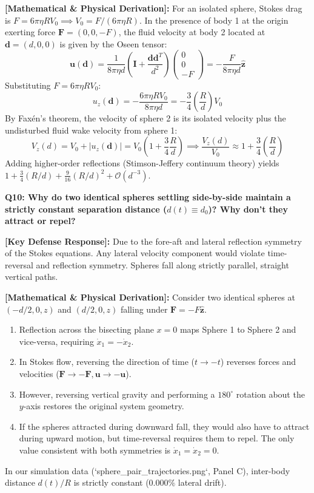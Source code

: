 \documentclass[11pt,a4paper]{article}
\newcommand{\question}[2]{
    \vspace{0.4cm}
    \noindent\colorbox{blue!10}{\parbox{\dimexpr\textwidth-2\fboxsep\relax}{
        \textbf{#1: #2}
    }}
    \vspace{0.2cm}
}
\newcommand{\shortanswer}[1]{
    \noindent\textbf{\textcolor{green!50!black}{[Key Defense Response]:}} #1
    \vspace{0.2cm}
}
\newcommand{\deepdetails}[1]{
    \noindent\textbf{\textcolor{blue!60!black}{[Mathematical \& Physical Derivation]:}} #1
    \vspace{0.2cm}
}
\begin{document}
\deepdetails{
For an isolated sphere, Stokes drag is $F = 6\pi\eta R V_0 \implies V_0 = F / (6\pi\eta R)$. 
In the presence of body 1 at the origin exerting force $\mathbf{F} = (0, 0, -F)$, the fluid velocity at body 2 located at $\mathbf{d} = (d, 0, 0)$ is given by the Oseen tensor:
\begin{equation}
    \mathbf{u}(\mathbf{d}) = \frac{1}{8\pi\eta d} \left( \mathbf{I} + \frac{\mathbf{d}\mathbf{d}^T}{d^2} \right) \begin{pmatrix} 0 \\ 0 \\ -F \end{pmatrix} = -\frac{F}{8\pi\eta d} \hat{\mathbf{z}}
\end{equation}
Substituting $F = 6\pi\eta R V_0$:
\begin{equation}
    u_z(\mathbf{d}) = -\frac{6\pi\eta R V_0}{8\pi\eta d} = -\frac{3}{4} \left(\frac{R}{d}\right) V_0
\end{equation}
By Fax\'en's theorem, the velocity of sphere 2 is its isolated velocity plus the undisturbed fluid wake velocity from sphere 1:
\begin{equation}
    V_z(d) = V_0 + |u_z(\mathbf{d})| = V_0 \left( 1 + \frac{3}{4}\frac{R}{d} \right) \implies \frac{V_z(d)}{V_0} \approx 1 + \frac{3}{4}\left(\frac{R}{d}\right)
\end{equation}
Adding higher-order reflections (Stimson-Jeffery continuum theory) yields $1 + \frac{3}{4}(R/d) + \frac{9}{16}(R/d)^2 + \mathcal{O}(d^{-3})$.
}

\vspace{0.4cm}
\question{Q10}{Why do two identical spheres settling side-by-side maintain a strictly constant separation distance ($d(t) \equiv d_0$)? Why don't they attract or repel?}

\shortanswer{Due to the fore-aft and lateral reflection symmetry of the Stokes equations. Any lateral velocity component would violate time-reversal and reflection symmetry. Spheres fall along strictly parallel, straight vertical paths.}

\deepdetails{
Consider two identical spheres at $(-d/2, 0, z)$ and $(d/2, 0, z)$ falling under $\mathbf{F} = -F \hat{\mathbf{z}}$.
\begin{enumerate}
    \item Reflection across the bisecting plane $x = 0$ maps Sphere 1 to Sphere 2 and vice-versa, requiring $\dot{x}_1 = -\dot{x}_2$.
    \item In Stokes flow, reversing the direction of time ($t \to -t$) reverses forces and velocities ($\mathbf{F} \to -\mathbf{F}, \mathbf{u} \to -\mathbf{u}$).
    \item However, reversing vertical gravity and performing a $180^\circ$ rotation about the $y$-axis restores the original system geometry.
    \item If the spheres attracted during downward fall, they would also have to attract during upward motion, but time-reversal requires them to repel. The only value consistent with both symmetries is $\dot{x}_1 = \dot{x}_2 = 0$.
\end{enumerate}
In our simulation data (`sphere_pair_trajectories.png`, Panel C), inter-body distance $d(t)/R$ is strictly constant ($0.000\%$ lateral drift).
}
\end{document}
